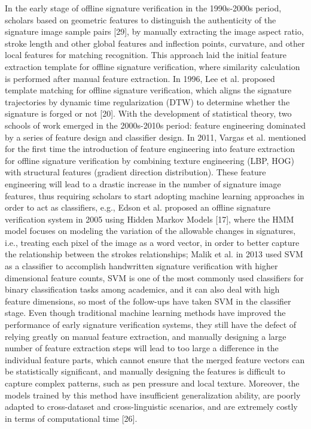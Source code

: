 In the early stage of offline signature verification in the 1990s-2000s period, scholars based on geometric features to distinguish the authenticity of the signature image sample pairs [29], by manually extracting the image aspect ratio, stroke length and other global features and inflection points, curvature, and other local features for matching recognition. This approach laid the initial feature extraction template for offline signature verification, where similarity calculation is performed after manual feature extraction. In 1996, Lee et al. proposed template matching for offline signature verification, which aligns the signature trajectories by dynamic time regularization (DTW) to determine whether the signature is forged or not [20]. With the development of statistical theory, two schools of work emerged in the 2000s-2010s period: feature engineering dominated by a series of feature design and classifier design. In 2011, Vargas et al. mentioned for the first time the introduction of feature engineering into feature extraction for offline signature verification by combining texture engineering (LBP, HOG) with structural features (gradient direction distribution). These feature engineering will lead to a drastic increase in the number of signature image features, thus requiring scholars to start adopting machine learning approaches in order to act as classifiers, e.g., Edson et al. proposed an offline signature verification system in 2005 using Hidden Markov Models [17], where the HMM model focuses on modeling the variation of the allowable changes in signatures, i.e., treating each pixel of the image as a word vector, in order to better capture the relationship between the strokes relationships; Malik et al. in 2013 used SVM as a classifier to accomplish handwritten signature verification with higher dimensional feature counts, SVM is one of the most commonly used classifiers for binary classification tasks among academics, and it can also deal with high feature dimensions, so most of the follow-ups have taken SVM in the classifier stage. Even though traditional machine learning methods have improved the performance of early signature verification systems, they still have the defect of relying greatly on manual feature extraction, and manually designing a large number of feature extraction steps will lead to too large a difference in the individual feature parts, which cannot ensure that the merged feature vectors can be statistically significant, and manually designing the features is difficult to capture complex patterns, such as pen pressure and local texture. Moreover, the models trained by this method have insufficient generalization ability, are poorly adapted to cross-dataset and cross-linguistic scenarios, and are extremely costly in terms of computational time [26].

